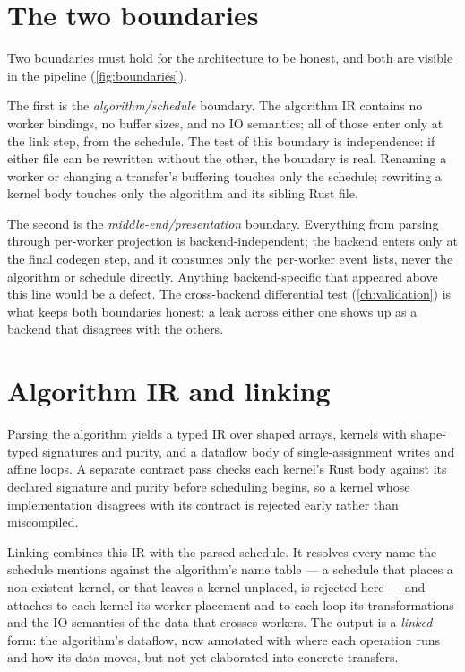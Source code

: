 \section{The two boundaries}\label{sec:arch-boundaries}

Two boundaries must hold for the architecture to be honest, and both are visible
in the pipeline (\cref{fig:boundaries}).

The first is the \emph{algorithm/schedule} boundary. The algorithm IR contains no
worker bindings, no buffer sizes, and no IO semantics; all of those enter only at
the link step, from the schedule. The test of this boundary is independence: if
either file can be rewritten without the other, the boundary is real. Renaming a
worker or changing a transfer's buffering touches only the schedule; rewriting a
kernel body touches only the algorithm and its sibling Rust file.

The second is the \emph{middle-end/presentation} boundary. Everything from
parsing through per-worker projection is backend-independent; the backend enters
only at the final codegen step, and it consumes only the per-worker event lists,
never the algorithm or schedule directly. Anything backend-specific that appeared
above this line would be a defect. The cross-backend differential test
(\cref{ch:validation}) is what keeps both boundaries honest: a leak across
either one shows up as a backend that disagrees with the others.



\section{Algorithm IR and linking}\label{sec:arch-link}

Parsing the algorithm yields a typed IR over shaped arrays, kernels with
shape-typed signatures and purity, and a dataflow body of single-assignment
writes and affine loops. A separate contract pass checks each kernel's Rust body
against its declared signature and purity before scheduling begins, so a kernel
whose implementation disagrees with its contract is rejected early rather than
miscompiled.

Linking combines this IR with the parsed schedule. It resolves every name the
schedule mentions against the algorithm's name table --- a schedule that places a
non-existent kernel, or that leaves a kernel unplaced, is rejected here --- and
attaches to each kernel its worker placement and to each loop its
transformations and the IO semantics of the data that crosses workers. The output
is a \emph{linked} form: the algorithm's dataflow, now annotated with where each
operation runs and how its data moves, but not yet elaborated into concrete
transfers.

